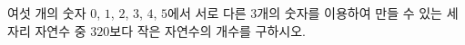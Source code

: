 \hspace*{2mm}\begin{minipage}[t]{\dimexpr\linewidth-2mm\relax}\vspace{0pt}
여섯 개의 숫자 $0$, $1$, $2$, $3$, $4$, $5$에서 서로 다른 $3$개의 숫자를 이용하여 만들 수 있는 세 자리 자연수 중 $320$보다 작은 자연수의 개수를 구하시오.\end{minipage}

